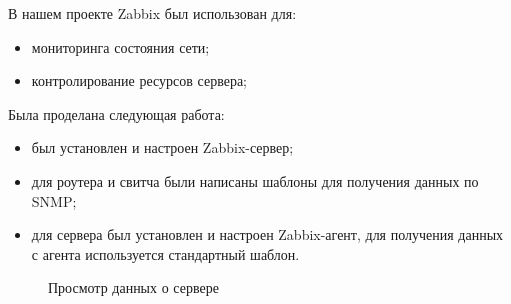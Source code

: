 В нашем проекте Zabbix был использован для:
\begin{itemize}
\item мониторинга состояния сети;
\item контролирование ресурсов сервера;
\end{itemize}

Была проделана следующая работа:
\begin{itemize}
\item был установлен и настроен Zabbix-сервер;
\item для роутера и свитча были написаны шаблоны для получения данных по SNMP;
\item для сервера был установлен и настроен Zabbix-агент, для получения данных с агента используется стандартный шаблон.
\end{itemize}

\begin{figure}[ht!]
\caption{Просмотр данных о сервере}
\end{figure}